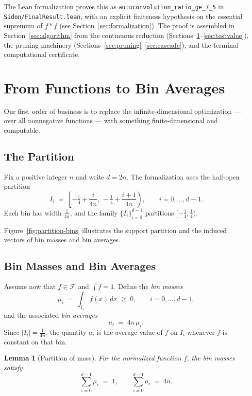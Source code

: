 \documentclass[11pt, letterpaper]{article}
\theoremstyle{paperplain}
\newtheorem{lemma}[theorem]{Lemma}
\theoremstyle{paperdef}
\begin{document}
The Lean formalization proves this as
\texttt{autoconvolution\_ratio\_ge\_7\_5} in
\texttt{Sidon/FinalResult.lean}, with an explicit finiteness hypothesis
on the essential supremum of $f*f$ (see
Section~\ref{sec:formalization}).
The proof is assembled in Section~\ref{sec:algorithm} from the continuous
reduction (Sections~\ref{sec:bin}--\ref{sec:testvalue}), the pruning
machinery (Sections~\ref{sec:pruning}--\ref{sec:cascade}), and the
terminal computational certificate.


\section{From Functions to Bin Averages}\label{sec:bin}

Our first order of business is to replace the infinite-dimensional
optimization --- over all nonnegative functions --- with something
finite-dimensional and computable.

\subsection{The Partition}

Fix a positive integer $n$ and write $d=2n$.  The formalization uses
the half-open partition
\[
  I_i
  \;=\;
  \left[-\tfrac14 + \frac{i}{4n},\,
        -\tfrac14 + \frac{i+1}{4n}\right),
  \qquad i=0,\dots,d-1.
\]
Each bin has width $\tfrac{1}{4n}$, and the family $\{I_i\}_{i=0}^{d-1}$
partitions $[-\tfrac14,\tfrac14)$.

Figure~\ref{fig:partition-bins} illustrates the support partition and
the induced vectors of bin masses and bin averages.

\subsection{Bin Masses and Bin Averages}

Assume now that $f\in\mathcal{F}$ and $\int f = 1$.  Define the
\emph{bin masses}
\[
  \mu_i \;=\; \int_{I_i} f(x)\,dx \;\ge\; 0,
  \qquad i=0,\dots,d-1,
\]
and the associated \emph{bin averages}
\[
  a_i \;=\; 4n\,\mu_i.
\]
Since $|I_i|=\tfrac{1}{4n}$, the quantity $a_i$ is the average value
of $f$ on $I_i$ whenever $f$ is constant on that bin.

\begin{lemma}[Partition of mass]
\label{lem:sum-bin-masses}
For the normalized function $f$, the bin masses satisfy
\[
  \sum_{i=0}^{d-1} \mu_i \;=\; 1,
  \qquad
  \sum_{i=0}^{d-1} a_i \;=\; 4n.
\]
\end{lemma}
\end{document}
